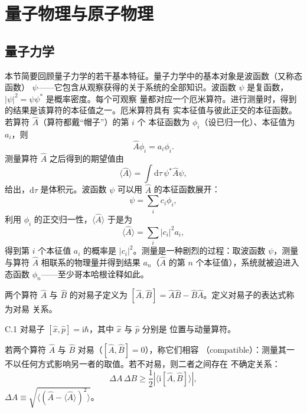 \chapter{量子物理与原子物理}

\section{量子力学}

本节简要回顾量子力学的若干基本特征。量子力学中的基本对象是波函数（又称态函数）
$\psi$——它包含从观察获得的关于系统的全部知识。波函数 $\psi$ 是复函数，
$|\psi|^{2}=\psi\psi^{*}$ 是概率密度。每个可观察
量都对应一个厄米算符。进行测量时，得到的结果是该算符的本征值之一。厄米算符具有
实本征值与彼此正交的本征函数。若算符 $\hat{A}$（算符都戴“帽子”）的第 $i$ 个
本征函数为 $\phi_i$（设已归一化）、本征值为 $a_i$，则
\begin{equation*}
\hat{A}\phi_i = a_i\phi_i.\tag{C.1}
\end{equation*}
测量算符 $\hat{A}$ 之后得到的期望值由
\begin{equation*}
\langle\hat{A}\rangle = \int\mathrm{d}\tau\,\psi^{*}\hat{A}\psi,\tag{C.2}
\end{equation*}
给出，$\mathrm{d}\tau$ 是体积元。波函数 $\psi$ 可以用 $\hat{A}$ 的本征函数展开：
\begin{equation*}
\psi = \sum_i c_i\phi_i,\tag{C.3}
\end{equation*}
利用 $\phi_i$ 的正交归一性，$\langle\hat{A}\rangle$ 于是为
\begin{equation*}
\langle\hat{A}\rangle = \sum_i|c_i|^{2}a_i,\tag{C.4}
\end{equation*}
得到第 $i$ 个本征值 $a_i$ 的概率是 $|c_i|^{2}$。测量是一种剧烈的过程：取波函数
$\psi$，测量与算符 $\hat{A}$ 相联系的物理量并得到结果 $a_n$（$\hat{A}$ 的第 $n$
个本征值），系统就被迫进入态函数 $\phi_n$——至少哥本哈根诠释如此。

两个算符 $\hat{A}$ 与 $\hat{B}$ 的对易子定义为
$[\hat{A},\hat{B}]=\hat{A}\hat{B}-\hat{B}\hat{A}$。定义对易子的表达式称为对易
关系。

\begin{example}{C.1}
对易子 $[\hat{x},\hat{p}]=\mathrm{i}\hbar$，其中 $\hat{x}$ 与 $\hat{p}$ 分别是
位置与动量算符。
\end{example}

若两个算符 $\hat{A}$ 与 $\hat{B}$ 对易（$[\hat{A},\hat{B}]=0$），称它们相容
（compatible）：测量其一不以任何方式影响另一者的取值。若不对易，则二者之间存在
不确定关系：
\begin{equation*}
\Delta A\,\Delta B \geq \frac{1}{2}|\langle\mathrm{i}[\hat{A},\hat{B}]\rangle|,\tag{C.5}
\end{equation*}
$\Delta A\equiv\sqrt{\langle(\hat{A}-\langle\hat{A}\rangle)^{2}\rangle}$。

